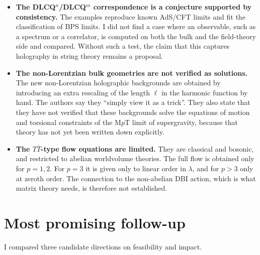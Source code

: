 \documentclass[11pt]{article}
\begin{document}
\begin{itemize}
\item \textbf{The DLCQ$^n$/DLCQ$^m$ correspondence is a conjecture supported by consistency.} The examples reproduce known AdS/CFT limits and fit the classification of BPS limits. I did not find a case where an observable, such as a spectrum or a correlator, is computed on both the bulk and the field-theory side and compared. Without such a test, the claim that this captures holography in string theory remains a proposal.

\item \textbf{The non-Lorentzian bulk geometries are not verified as solutions.} The new non-Lorentzian holographic backgrounds are obtained by introducing an extra rescaling of the length $\ell$ in the harmonic function by hand. The authors say they ``simply view it as a trick''. They also state that they have not verified that these backgrounds solve the equations of motion and torsional constraints of the M$p$T limit of supergravity, because that theory has not yet been written down explicitly.

\item \textbf{The $T\bar{T}$-type flow equations are limited.} They are classical and bosonic, and restricted to abelian worldvolume theories. The full flow is obtained only for $p=1,2$. For $p=3$ it is given only to linear order in $\lambda$, and for $p>3$ only at zeroth order. The connection to the non-abelian DBI action, which is what matrix theory needs, is therefore not established.
\end{itemize}

\section{Most promising follow-up}
I compared three candidate directions on feasibility and impact.
\end{document}
